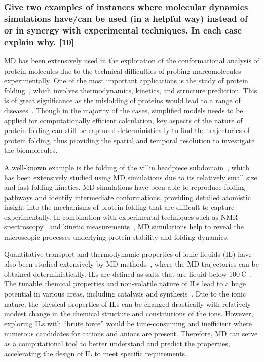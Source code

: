 \documentclass[a4paper,10pt,twocolumn]{article}
\begin{document}
\subsubsection*{Give two examples of instances where molecular dynamics simulations have/can be used (in a helpful way) instead of or in synergy with experimental techniques. In each case explain why. [10]}

MD has been extensively used in the exploration of the conformational analysis of protein molecules due to the technical difficulties of probing marcomolecules experimentally. One of the most important applications is the study of protein folding~\cite{karplus2005molecular,swope2004describing,sugita1999replica}, which involves thermodynamics, kinetics, and
structure prediction. This is of great significance as the misfolding of proteins would lead to a range of diseases~\cite{dobson2003protein}. Though in the majority of the cases, simplified models needs to be applied for computationally efficient calculation, key aspects of the nature of protein folding can still be captured deterministically to find the trajectories of protein folding, thus providing the spatial and temporal resolution to investigate the biomolecules. 

A well-known example is the folding of the villin headpiece subdomain~\cite{lei2010folding}, which has been extensively studied using MD simulations due to its relatively small size and fast folding kinetics. MD simulations have been able to reproduce folding pathways and identify intermediate conformations, providing detailed atomistic insight into the mechanisms of protein folding that are difficult to capture experimentally. In combination with experimental techniques such as NMR spectroscopy~\cite{mcknight1997nmr} and kinetic measurements~\cite{zhu2011evidence}, MD simulations help to reveal the microscopic processes underlying protein stability and folding dynamics.

Quantitative transport and thermodynamic properties of ionic liquids (IL) have also been studied extensively by MD methods~\cite{maginn2007atomistic,cadena2006molecular}, where the MD trajectories can be obtained deterministically. ILs are defined as salts that are liquid below 100℃~\cite{cadena2006molecular}. The tunable chemical properties and non-volatile nature of ILs lead to a huge potential in various areas, including catalysis and synthesis~\cite{rogers2002ionic,steinrueck2015ionic}. Due to the ionic nature, the physical properties of ILs can be changed drastically with relatively modest change in the chemical structure and constitutions of the ions. However, exploring ILs with ``brute force'' would be time-consuming and inefficient where numerous candidates for cations and anions are present. Therefore, MD can serve as a computational tool to better understand and predict the properties, accelerating the design of IL to meet specific requirements.
\end{document}
